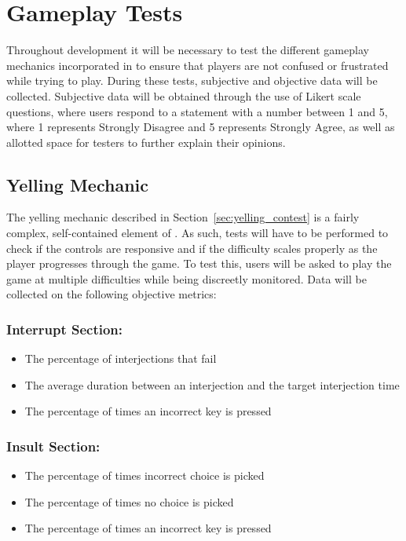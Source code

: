 \clearpage
\section{Gameplay Tests}

Throughout development it will be necessary to test the different gameplay mechanics incorporated in \ourgame{} to ensure that players are not confused or frustrated while trying to play. During these tests, subjective and objective data will be collected. Subjective data will be obtained through the use of Likert scale questions, where users respond to a statement with a number between 1 and 5, where 1 represents Strongly Disagree and 5 represents Strongly Agree, as well as allotted space for testers to further explain their opinions.

\subsection{Yelling Mechanic}
The yelling mechanic described in Section~\ref{sec:yelling_contest} is a fairly complex, self-contained element of \ourgame{}. As such, tests will have to be performed to check if the controls are responsive and if the difficulty scales properly as the player progresses through the game. To test this, users will be asked to play the game at multiple difficulties while being discreetly monitored. Data will be collected on the following objective metrics:

\subsubsection{Interrupt Section:}
\begin{itemize}
\item{The percentage of interjections that fail}
\item{The average duration between an interjection and the target interjection time}
\item{The percentage of times an incorrect key is pressed}
\end{itemize}
\subsubsection{Insult Section:}
\begin{itemize}
\item{The percentage of times incorrect choice is picked}
\item{The percentage of times no choice is picked}
\item{The percentage of times an incorrect key is pressed}
\end{itemize}

